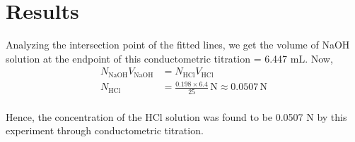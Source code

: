 \documentclass[11pt, a4paper, abstract=true]{scrartcl}
\begin{document}
\section{Results}

Analyzing the intersection point of the fitted lines, we get the volume of NaOH solution at the endpoint of this conductometric titration = 6.447 mL. Now, \begin{align*}
    N_{\text{NaOH}}V_{\text{NaOH}} &= N_{\text{HCl}}V_{\text{HCl}} \\ N_{\text{HCl}} &= \frac{0.198 \times 6.4}{25} \, \text{N} \approx 0.0507 \, \text{N}\\ 
\end{align*}

Hence, the concentration of the HCl solution was found to be 0.0507 N by this experiment through conductometric titration. 
\end{document}
